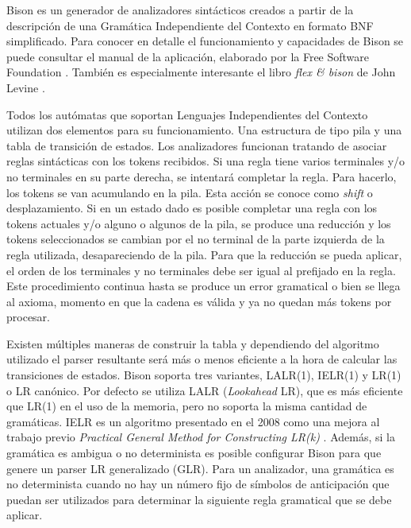 Bison es un generador de analizadores sintácticos creados a partir de la descripción de una Gramática Independiente del Contexto en formato BNF simplificado. Para conocer en detalle el funcionamiento y capacidades de Bison se puede consultar el manual de la aplicación, elaborado por la Free Software Foundation
\cite{fsf_web_bisonManual}. También es especialmente interesante el libro \emph{flex \& bison} de John Levine \cite{levine_book_flexBison}.


\label{automatas-pila} Todos los autómatas que soportan Lenguajes Independientes del Contexto utilizan dos elementos para su funcionamiento. Una estructura de tipo pila y una tabla de transición de estados. Los analizadores funcionan tratando de asociar reglas sintácticas con los tokens recibidos. Si una regla tiene varios terminales y/o no terminales en su parte derecha, se intentará completar la regla. Para hacerlo, los tokens se van acumulando en la pila. Esta acción se conoce como \emph{shift} o desplazamiento. Si en un estado dado es posible completar una regla con los tokens actuales y/o alguno o algunos de la pila, se produce una reducción y los tokens seleccionados se cambian por el no terminal de la parte izquierda de la regla utilizada, desapareciendo de la pila. Para que la reducción se pueda aplicar, el orden de los terminales y no terminales debe ser igual al prefijado en la regla. Este procedimiento continua hasta se produce un error gramatical o bien se llega al axioma, momento en que la cadena es válida y ya no quedan más tokens por procesar.

Existen múltiples maneras de construir la tabla y dependiendo del algoritmo utilizado el parser resultante será más o menos eficiente a la hora de calcular las transiciones de estados. Bison soporta tres variantes, LALR(1), IELR(1) y LR(1) o LR canónico. Por defecto se utiliza LALR (\emph{Lookahead} LR), que es más eficiente que LR(1) en el uso de la memoria, pero no soporta la misma cantidad de gramáticas. IELR es un algoritmo presentado en el 2008 \cite{dennyMalloy_paper_IELRAlgorithm} como una mejora al trabajo previo \emph{Practical General Method for Constructing LR(k)} \cite{pager_paper_constructLRparsers}. Además, si la gramática es ambigua o no determinista es posible configurar Bison para que genere un parser LR generalizado (GLR). Para un analizador, una gramática es no determinista cuando no hay un número fijo de símbolos de anticipación que puedan ser utilizados para determinar la siguiente regla gramatical que se debe aplicar.

